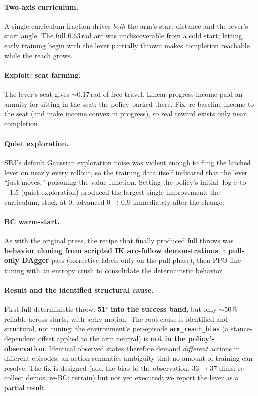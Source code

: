 \documentclass[11pt]{article}
\newcommand{\degs}{$^{\circ}$}
\begin{document}
\paragraph{Two-axis curriculum.} A single curriculum fraction drives \emph{both} the arm's start distance and the lever's start angle. The full 0.63\,rad arc was undiscoverable from a cold start; letting early training begin with the lever partially thrown makes completion reachable while the reach grows.

\paragraph{Exploit: seat farming.} The lever's seat gives ${\sim}0.17$\,rad of free travel. Linear progress income paid an annuity for sitting in the seat; the policy parked there. Fix: re-baseline income to the seat (and make income convex in progress), so real reward exists only near completion.

\paragraph{Quiet exploration.} SB3's default Gaussian exploration noise was violent enough to fling the latched lever on nearly every rollout, so the training data itself indicated that the lever ``just moves,'' poisoning the value function. Setting the policy's initial $\log\sigma$ to $\mathbf{-1.5}$ (quiet exploration) produced the largest single improvement: the curriculum, stuck at 0, advanced $0 \to 0.9$ immediately after the change.

\paragraph{BC warm-start.} As with the original press, the recipe that finally produced full throws was \textbf{behavior cloning from scripted IK arc-follow demonstrations}, a \textbf{pull-only DAgger} pass \cite{dagger} (corrective labels only on the pull phase), then PPO fine-tuning with an entropy crush to consolidate the deterministic behavior.

\paragraph{Result and the identified structural cause.} First full deterministic throw: \textbf{51\degs{} into the success band}, but only ${\sim}50\%$ reliable across starts, with jerky motion. The root cause is identified and structural, not tuning: the environment's per-episode \texttt{arm\_reach\_bias} (a stance-dependent offset applied to the arm neutral) is \textbf{not in the policy's observation}. Identical observed states therefore demand \emph{different} actions in different episodes, an action-semantics ambiguity that no amount of training can resolve. The fix is designed (add the bias to the observation, $33 \to 37$ dims; re-collect demos; re-BC; retrain) but not yet executed; we report the lever as a partial result.
\end{document}
